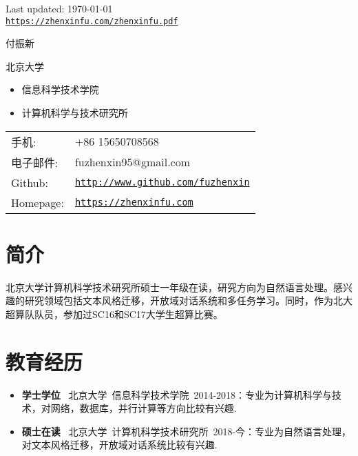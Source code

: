 \documentclass[letterpaper]{article}
\def\footerlink{https://zhenxinfu.com/zhenxinfu.pdf}
\begin{document}
\bigskip

\begin{center}
  \begin{footnotesize}
    Last updated: \today \\
    \href{\footerlink}{\texttt{\footerlink}}
  \end{footnotesize}
\end{center}




{\huge 付振新}


\vspace{0.25in}

\begin{minipage}{0.45\linewidth}
  \begin{large}北京大学\end{large}
  \begin{itemize}
    \itemsep=-0.02in
      \item 信息科学技术学院
      \item 计算机科学与技术研究所
  \end{itemize}
  
\end{minipage}
\begin{minipage}{0.45\linewidth}
  \begin{tabular}{ll}
    手机: & +86 15650708568 \\
    电子邮件: & fuzhenxin95@gmail.com \\
    Github: & \href{http://www.github.com/fuzhenxin}{\tt http://www.github.com/fuzhenxin} \\
    Homepage: & \href{http://zhenxinfu.com}{\tt https://zhenxinfu.com} \\
  \end{tabular}
\end{minipage}


\section*{简介}
北京大学计算机科学技术研究所硕士一年级在读，研究方向为自然语言处理。感兴趣的研究领域包括文本风格迁移，开放域对话系统和多任务学习。同时，作为北大超算队队员，参加过SC16和SC17大学生超算比赛。


\section*{教育经历}
\begin{itemize}
  \item \textbf{学士学位} ~北京大学~信息科学技术学院~2014-2018：专业为计算机科学与技术，对网络，数据库，并行计算等方向比较有兴趣.
  \item \textbf{硕士在读} ~北京大学~计算机科学技术研究所~2018-今：专业为自然语言处理，对文本风格迁移，开放域对话系统比较有兴趣.
\end{itemize}
\end{document}
